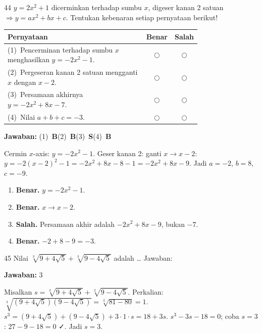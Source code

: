 \documentclass[11pt]{article}
\newcommand{\jawaban}[1]{%
  \noindent\colorbox{gold!30}{\parbox{\dimexpr\linewidth-2\fboxsep\relax}{%
    \textbf{Jawaban:} #1}}\par\smallskip}
\begin{document}
\begin{soal}{44}
$y=2x^2+1$ dicerminkan terhadap sumbu $x$, digeser kanan 2 satuan $\Rightarrow y=ax^2+bx+c$.
Tentukan kebenaran setiap pernyataan berikut!

\par\smallskip
{\renewcommand{\arraystretch}{1.4}%
\begin{tabular}{@{}p{0.76\linewidth}cc@{}}
\hline\textbf{Pernyataan}&\textbf{Benar}&\textbf{Salah}\\\hline
(1)~Pencerminan terhadap sumbu $x$ menghasilkan $y=-2x^2-1$.&$\bigcirc$&$\bigcirc$\\
(2)~Pergeseran kanan 2 satuan mengganti $x$ dengan $x-2$.&$\bigcirc$&$\bigcirc$\\
(3)~Persamaan akhirnya $y=-2x^2+8x-7$.&$\bigcirc$&$\bigcirc$\\
(4)~Nilai $a+b+c=-3$.&$\bigcirc$&$\bigcirc$\\\hline
\end{tabular}}
\end{soal}
\begin{pembox}
\jawaban{(1)~\textbf{B}\quad(2)~\textbf{B}\quad(3)~\textbf{S}\quad(4)~\textbf{B}}
Cermin $x$-axis: $y=-2x^2-1$. Geser kanan 2: ganti $x\to x-2$:
$y=-2(x-2)^2-1=-2x^2+8x-8-1=-2x^2+8x-9$.
Jadi $a=-2$, $b=8$, $c=-9$.
\begin{enumerate}[leftmargin=*,topsep=2pt,itemsep=2pt]
\item \textbf{Benar.} $y=-2x^2-1$.
\item \textbf{Benar.} $x\to x-2$.
\item \textbf{Salah.} Persamaan akhir adalah $-2x^2+8x-9$, bukan $-7$.
\item \textbf{Benar.} $-2+8-9=-3$.
\end{enumerate}
\end{pembox}

\begin{soal}{45}
Nilai $\sqrt[3]{9+4\sqrt{5}}+\sqrt[3]{9-4\sqrt{5}}$ adalah \ldots\hfill
Jawaban:\enspace\underline{\hspace{3cm}}
\end{soal}
\begin{pembox}
\jawaban{$3$}
Misalkan $s=\sqrt[3]{9+4\sqrt5}+\sqrt[3]{9-4\sqrt5}$.
Perkalian: $\sqrt[3]{(9+4\sqrt5)(9-4\sqrt5)}=\sqrt[3]{81-80}=1$.
$s^3=(9+4\sqrt5)+(9-4\sqrt5)+3\cdot1\cdot s=18+3s$.
$s^3-3s-18=0$; coba $s=3$: $27-9-18=0$ ✓. Jadi $s=3$.
\end{pembox}
\end{document}
